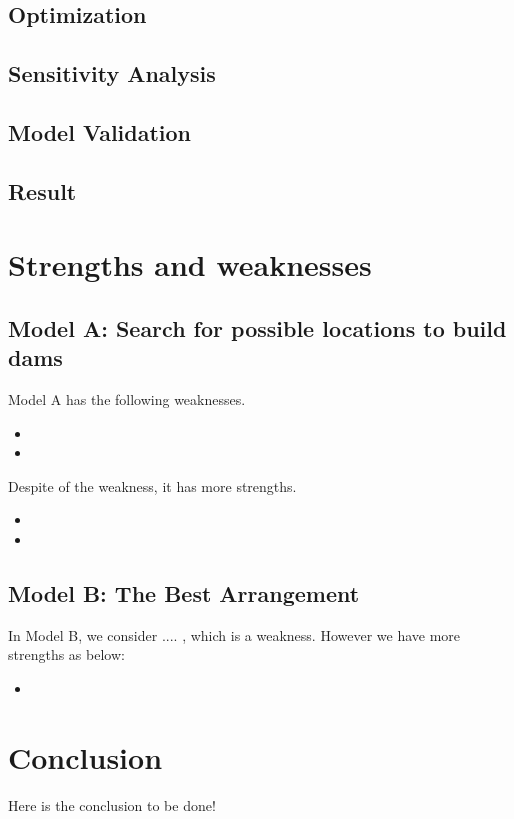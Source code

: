 \documentclass{mcmthesis}
\begin{document}
\subsection{Optimization}

\subsection{Sensitivity Analysis}

\subsection{Model Validation}

\subsection{Result}

\section{Strengths and weaknesses}
\subsection{Model A: Search for possible locations to build dams}
Model A has the following weaknesses.
\begin{itemize}
\item 
\item 
\end{itemize}
Despite of the weakness, it has more strengths.
\begin{itemize}
  \item 
  \item 
\end{itemize}

\subsection{Model B: The Best Arrangement}
In Model B, we consider .... , which is a weakness. However we have more strengths as below:
\begin{itemize}
  \item 
\end{itemize}

\section{Conclusion}
\indent \indent Here is the conclusion to be done!
\end{document}
